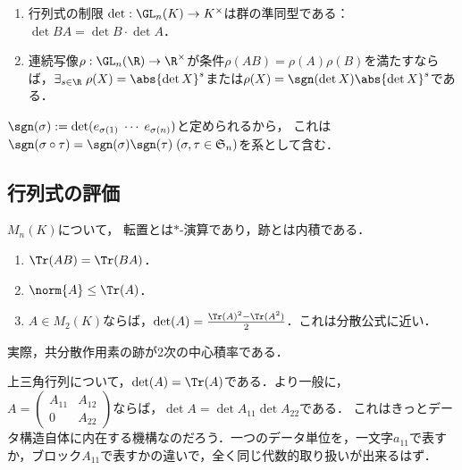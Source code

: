 \documentclass[uplatex, dvipdfmx]{jsreport}
\begin{document}
\begin{proposition}\mbox{}
    \begin{enumerate}
        \item 行列式の制限
        $\det:\GL_n(K)\to K^\times$は群の準同型である：$\det BA=\det B\cdot\det A$．
        \item 連続写像$\rho:\GL_n(\R)\to\R^\times$が条件$\rho(AB)=\rho(A)\rho(B)$を満たすならば，$\exists_{s\in\R}\;\rho(X)=\abs{\det X}^s$または$\rho(X)=\sgn(\det X)\abs{\det X}^s$である．
    \end{enumerate}
\end{proposition}
\begin{remarks}[置換の符号]
    $\sgn(\sigma):=\det(e_{\sigma(1)}\;\cdots\;e_{\sigma(n)})$と定められるから，
    これは$\sgn(\sigma\circ\tau)=\sgn(\sigma)\sgn(\tau)\;(\sigma,\tau\in\mathfrak{S}_n)$を系として含む．
\end{remarks}

\subsection{行列式の評価}

\begin{tcolorbox}[colframe=ForestGreen, colback=ForestGreen!10!white,breakable,colbacktitle=ForestGreen!40!white,coltitle=black,fonttitle=\bfseries\sffamily,
title=]
    $M_n(K)$について，
    転置とは$*$-演算であり，跡とは内積である．
\end{tcolorbox}

\begin{proposition}\mbox{}
    \begin{enumerate}
        \item $\Tr(AB)=\Tr(BA)$．
        \item $\norm{A}\le\Tr(A)$．
        \item $A\in M_2(K)$ならば，$\det(A)=\frac{\Tr(A)^2-\Tr(A^2)}{2}$．これは分散公式に近い．
    \end{enumerate}
\end{proposition}
\begin{remarks}
    実際，共分散作用素の跡が2次の中心積率である．
\end{remarks}

\begin{example}[上三角行列の行列式]\label{example-determinant-of-triangular-matrices}
    上三角行列について，$\det (A)=\Tr(A)$である．より一般に，
    $A=\begin{pmatrix}A_{11}&A_{12}\\0&A_{22}\end{pmatrix}$ならば，$\det A=\det A_{11}\det A_{22}$である．
    これはきっとデータ構造自体に内在する機構なのだろう．一つのデータ単位を，一文字$a_{11}$で表すか，ブロック$A_{11}$で表すかの違いで，全く同じ代数的取り扱いが出来るはず．
\end{example}
\end{document}
